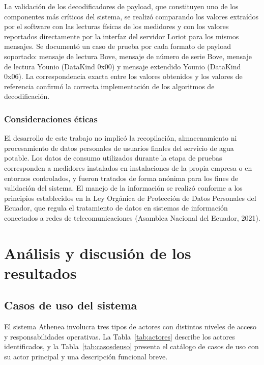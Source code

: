 \documentclass[12pt,a4paper,oneside]{report}
\begin{document}
La validación de los decodificadores de payload, que constituyen uno de los componentes más críticos del sistema, se realizó comparando los valores extraídos por el software con las lecturas físicas de los medidores y con los valores reportados directamente por la interfaz del servidor Loriot para los mismos mensajes. Se documentó un caso de prueba por cada formato de payload soportado: mensaje de lectura Bove, mensaje de número de serie Bove, mensaje de lectura Younio (DataKind 0x00) y mensaje extendido Younio (DataKind 0x06). La correspondencia exacta entre los valores obtenidos y los valores de referencia confirmó la correcta implementación de los algoritmos de decodificación.

\subsection*{Consideraciones éticas}

El desarrollo de este trabajo no implicó la recopilación, almacenamiento ni procesamiento de datos personales de usuarios finales del servicio de agua potable. Los datos de consumo utilizados durante la etapa de pruebas corresponden a medidores instalados en instalaciones de la propia empresa o en entornos controlados, y fueron tratados de forma anónima para los fines de validación del sistema. El manejo de la información se realizó conforme a los principios establecidos en la Ley Orgánica de Protección de Datos Personales del Ecuador, que regula el tratamiento de datos en sistemas de información conectados a redes de telecomunicaciones (Asamblea Nacional del Ecuador, 2021).

\chapter{Análisis y discusión de los resultados}

\section{Casos de uso del sistema}\label{sec:casos-de-uso}

El sistema Athenea involucra tres tipos de actores con distintos niveles de acceso y responsabilidades operativas. La Tabla~\ref{tab:actores} describe los actores identificados, y la Tabla~\ref{tab:casosdeuso} presenta el catálogo de casos de uso con su actor principal y una descripción funcional breve.
\end{document}
